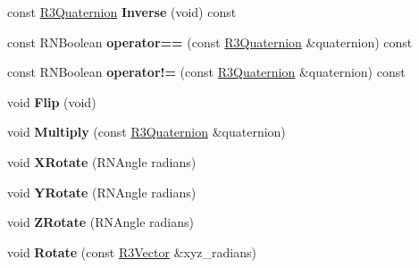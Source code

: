 \begin{DoxyCompactItemize}
\item 
const \hyperlink{class_r3_quaternion}{R3\+Quaternion} {\bfseries Inverse} (void) const \hypertarget{class_r3_quaternion_a541db26f54e63606ac6e166c7141ac30}{}\label{class_r3_quaternion_a541db26f54e63606ac6e166c7141ac30}

\item 
const R\+N\+Boolean {\bfseries operator==} (const \hyperlink{class_r3_quaternion}{R3\+Quaternion} \&quaternion) const \hypertarget{class_r3_quaternion_a1864313908761dd336c1fcc0946b4f32}{}\label{class_r3_quaternion_a1864313908761dd336c1fcc0946b4f32}

\item 
const R\+N\+Boolean {\bfseries operator!=} (const \hyperlink{class_r3_quaternion}{R3\+Quaternion} \&quaternion) const \hypertarget{class_r3_quaternion_a900b3664dd02655ce7dfabcd9a5e0a79}{}\label{class_r3_quaternion_a900b3664dd02655ce7dfabcd9a5e0a79}

\item 
void {\bfseries Flip} (void)\hypertarget{class_r3_quaternion_a3eec62818c63ac0216a6388b145b85c0}{}\label{class_r3_quaternion_a3eec62818c63ac0216a6388b145b85c0}

\item 
void {\bfseries Multiply} (const \hyperlink{class_r3_quaternion}{R3\+Quaternion} \&quaternion)\hypertarget{class_r3_quaternion_aabcd693be0383364af44229a281154c7}{}\label{class_r3_quaternion_aabcd693be0383364af44229a281154c7}

\item 
void {\bfseries X\+Rotate} (R\+N\+Angle radians)\hypertarget{class_r3_quaternion_a3e931dab99239131306229af06672e53}{}\label{class_r3_quaternion_a3e931dab99239131306229af06672e53}

\item 
void {\bfseries Y\+Rotate} (R\+N\+Angle radians)\hypertarget{class_r3_quaternion_af5af822a035563eaaf2bda3309889967}{}\label{class_r3_quaternion_af5af822a035563eaaf2bda3309889967}

\item 
void {\bfseries Z\+Rotate} (R\+N\+Angle radians)\hypertarget{class_r3_quaternion_a085bfc18844112f2c6910af2c112aed8}{}\label{class_r3_quaternion_a085bfc18844112f2c6910af2c112aed8}

\item 
void {\bfseries Rotate} (const \hyperlink{class_r3_vector}{R3\+Vector} \&xyz\+\_\+radians)\hypertarget{class_r3_quaternion_a8b09253e5dcff3ccc36b4251a52bdaa6}{}\label{class_r3_quaternion_a8b09253e5dcff3ccc36b4251a52bdaa6}


\end{DoxyCompactItemize}
